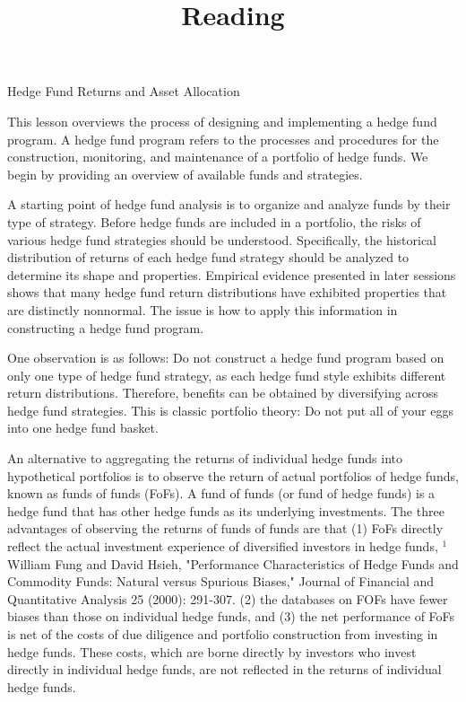 \documentclass[11pt]{article}
\title{Reading }
\author{}
\date{}
\begin{document}
\maketitle
Hedge Fund Returns and Asset Allocation

This lesson overviews the process of designing and implementing a hedge fund program. A hedge fund program refers to the processes and procedures for the construction, monitoring, and maintenance of a portfolio of hedge funds. We begin by providing an overview of available funds and strategies.

A starting point of hedge fund analysis is to organize and analyze funds by their type of strategy. Before hedge funds are included in a portfolio, the risks of various hedge fund strategies should be understood. Specifically, the historical distribution of returns of each hedge fund strategy should be analyzed to determine its shape and properties. Empirical evidence presented in later sessions shows that many hedge fund return distributions have exhibited properties that are distinctly nonnormal. The issue is how to apply this information in constructing a hedge fund program.

One observation is as follows: Do not construct a hedge fund program based on only one type of hedge fund strategy, as each hedge fund style exhibits different return distributions. Therefore, benefits can be obtained by diversifying across hedge fund strategies. This is classic portfolio theory: Do not put all of your eggs into one hedge fund basket.

An alternative to aggregating the returns of individual hedge funds into hypothetical portfolios is to observe the return of actual portfolios of hedge funds, known as funds of funds (FoFs). A fund of funds (or fund of hedge funds) is a hedge fund that has other hedge funds as its underlying investments. The three advantages of observing the returns of funds of funds are that (1) FoFs directly reflect the actual investment experience of diversified investors in hedge funds, ${ }^{1}$ William Fung and David Hsieh, "Performance Characteristics of Hedge Funds and Commodity Funds: Natural versus Spurious Biases," Journal of Financial and Quantitative Analysis 25 (2000): 291-307. (2) the databases on FOFs have fewer biases than those on individual hedge funds, and (3) the net performance of FoFs is net of the costs of due diligence and portfolio construction from investing in hedge funds. These costs, which are borne directly by investors who invest directly in individual hedge funds, are not reflected in the returns of individual hedge funds.
\end{document}
